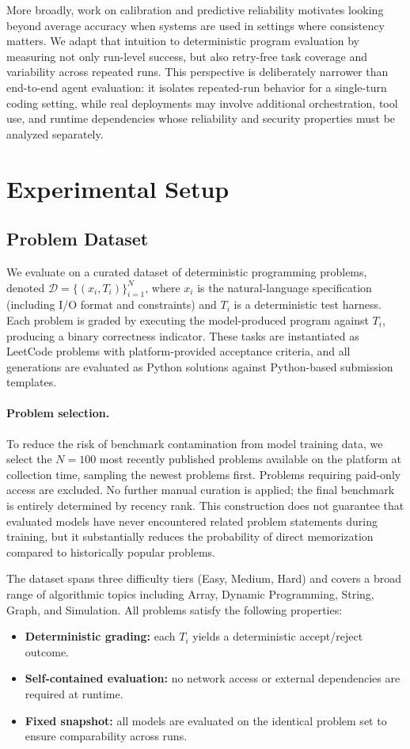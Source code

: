 \documentclass[11pt]{article}
\begin{document}
More broadly, work on calibration and predictive reliability \cite{guo2017calibration} motivates looking beyond average accuracy when systems are used in settings where consistency matters. We adapt that intuition to deterministic program evaluation by measuring not only run-level success, but also retry-free task coverage and variability across repeated runs. This perspective is deliberately narrower than end-to-end agent evaluation: it isolates repeated-run behavior for a single-turn coding setting, while real deployments may involve additional orchestration, tool use, and runtime dependencies whose reliability and security properties must be analyzed separately.

\section{Experimental Setup}

\subsection{Problem Dataset}
We evaluate on a curated dataset of deterministic programming problems, denoted $\mathcal{D}=\{(x_i, T_i)\}_{i=1}^{N}$, where $x_i$ is the natural-language specification (including I/O format and constraints) and $T_i$ is a deterministic test harness. Each problem is graded by executing the model-produced program against $T_i$, producing a binary correctness indicator. These tasks are instantiated as LeetCode problems with platform-provided acceptance criteria, and all generations are evaluated as Python solutions against Python-based submission templates.

\paragraph{Problem selection.} To reduce the risk of benchmark contamination from model training data, we select the $N=100$ most recently published problems available on the platform at collection time, sampling the newest problems first. Problems requiring paid-only access are excluded. No further manual curation is applied; the final benchmark is entirely determined by recency rank. This construction does not guarantee that evaluated models have never encountered related problem statements during training, but it substantially reduces the probability of direct memorization compared to historically popular problems.

The dataset spans three difficulty tiers (Easy, Medium, Hard) and covers a broad range of algorithmic topics including Array, Dynamic Programming, String, Graph, and Simulation. All problems satisfy the following properties:
\begin{itemize}
  \item \textbf{Deterministic grading:} each $T_i$ yields a deterministic accept/reject outcome.
  \item \textbf{Self-contained evaluation:} no network access or external dependencies are required at runtime.
  \item \textbf{Fixed snapshot:} all models are evaluated on the identical problem set to ensure comparability across runs.
\end{itemize}
\end{document}
